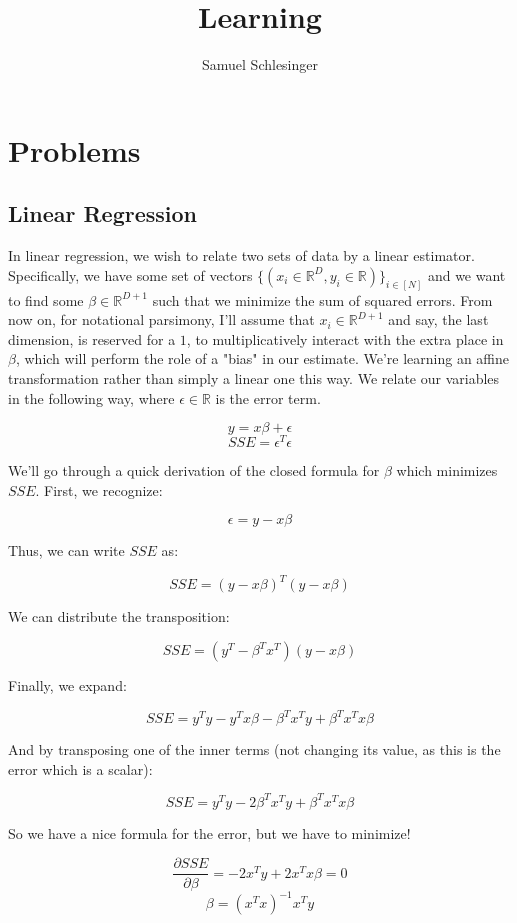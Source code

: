 \documentclass{article}
\title{Learning}
\author{Samuel Schlesinger}
\begin{document}
\maketitle

\section{Problems}

\subsection{Linear Regression}

In linear regression, we wish to relate two sets of data by a linear estimator. Specifically,
we have some set of vectors $\{(x_i \in \mathbb{R}^D, y_i \in \mathbb{R})\}_{i \in [N]}$ and
we want to find some $\beta \in \mathbb{R}^{D + 1}$ such that we minimize the sum of squared
errors. From now on, for notational parsimony, I'll assume that $x_i \in \mathbb{R}^{D+1}$ and
say, the last dimension, is reserved for a $1$, to multiplicatively interact with the extra
place in $\beta$, which will perform the role of a "bias" in our estimate. We're learning an
affine transformation rather than simply a linear one this way. We relate our variables in the
following way, where $\epsilon \in \mathbb{R}$ is the error term.

\[ y = x\beta + \epsilon \]
\[ SSE = \epsilon^T\epsilon \]

We'll go through a quick derivation of the closed formula for $\beta$ which minimizes $SSE$.
First, we recognize:

\[ \epsilon = y - x\beta \]

Thus, we can write $SSE$ as:

\[ SSE = (y - x\beta)^T(y - x\beta) \]

We can distribute the transposition:

\[ SSE = (y^T - \beta^Tx^T)(y - x\beta) \]

Finally, we expand:

\[ SSE = y^Ty - y^Tx\beta - \beta^Tx^Ty + \beta^Tx^Tx\beta \]

And by transposing one of the inner terms (not changing its value, as this is the error which
is a scalar):

\[ SSE = y^Ty - 2\beta^Tx^Ty + \beta^Tx^Tx\beta \]

So we have a nice formula for the error, but we have to minimize!

\[ \frac{\partial SSE}{\partial \beta} = -2x^Ty + 2x^Tx\beta = 0 \]
\[ \beta = (x^Tx)^{-1}x^Ty \]
\end{document}
